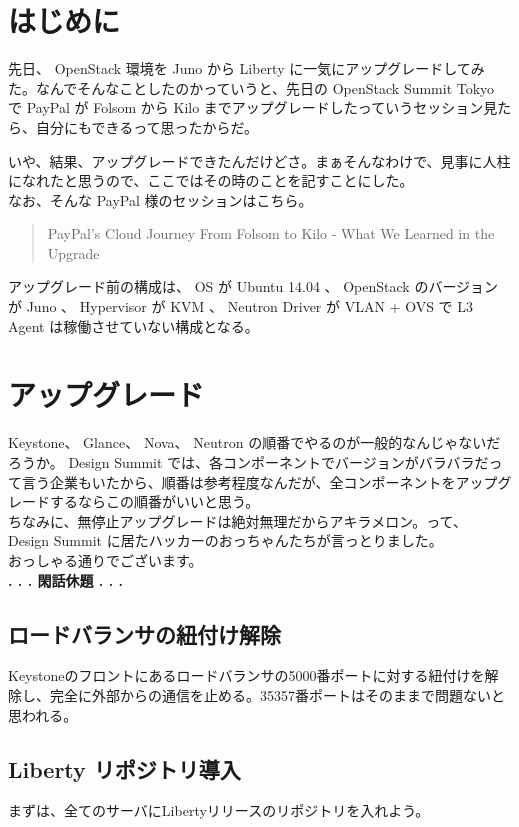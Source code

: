 \documentclass[9pt,b5paper,tombo,openany]{jsbook}
\begin{document}
\section{はじめに}
先日、 OpenStack 環境を Juno から Liberty に一気にアップグレードしてみた。なんでそんなことしたのかっていうと、先日の OpenStack Summit Tokyo で PayPal が Folsom から Kilo までアップグレードしたっていうセッション見たら、自分にもできるって思ったからだ。

いや、結果、アップグレードできたんだけどさ。まぁそんなわけで、見事に人柱になれたと思うので、ここではその時のことを記すことにした。\\[1ex]

\noindent
なお、そんな PayPal 様のセッションはこちら。

\begin{quote}
	PayPal's Cloud Journey From Folsom to Kilo - What We Learned in the Upgrade
\end{quote}

アップグレード前の構成は、 OS が Ubuntu 14.04 、 OpenStack のバージョンが Juno 、 Hypervisor が KVM 、 Neutron Driver が VLAN + OVS で L3 Agent は稼働させていない構成となる。

\section{アップグレード}
Keystone、 Glance、 Nova、 Neutron の順番でやるのが一般的なんじゃないだろうか。 Design Summit では、各コンポーネントでバージョンがバラバラだって言う企業もいたから、順番は参考程度なんだが、全コンポーネントをアップグレードするならこの順番がいいと思う。\\[1ex]
ちなみに、無停止アップグレードは絶対無理だからアキラメロン。って、 Design Summit に居たハッカーのおっちゃんたちが言っとりました。\\[1ex]

\noindent
おっしゃる通りでございます。\\[1ex]

\noindent
\textbf{. . . 閑話休題 . . .}

\subsection{ロードバランサの紐付け解除}
Keystoneのフロントにあるロードバランサの5000番ポートに対する紐付けを解除し、完全に外部からの通信を止める。35357番ポートはそのままで問題ないと思われる。

\subsection{Liberty リポジトリ導入}
\noindent
まずは、全てのサーバにLibertyリリースのリポジトリを入れよう。
\end{document}
